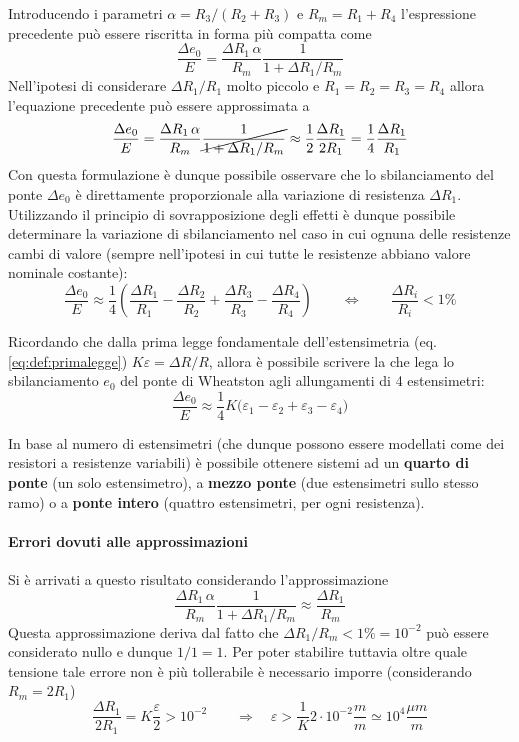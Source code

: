 		Introducendo i parametri $\alpha= R_3 / (R_2+R_3)$ e $R_m = R_1+R_4$ l'espressione precedente può essere riscritta in forma più compatta come
		\[ \frac{\Delta e_0}{E} = \frac{\Delta R_1 \, \alpha}{R_m} \frac{1}{1+\Delta R_1/R_m} \]
		Nell'ipotesi di considerare $\Delta R_1/R_1$ molto piccolo e $R_1=R_2=R_3=R_4$ allora l'equazione precedente può essere approssimata a
		\[ \frac{\Delta e_0}{E} = \frac{\Delta R_1 \, \alpha}{R_m} \cancel{\frac{1}{1+\Delta R_1/R_m}} \approx \frac 1 2 \frac{\Delta R_1}{2R_1} = \frac 1 4 \frac{\Delta R_1}{R_1} \]
		Con questa formulazione è dunque possibile osservare che lo sbilanciamento del ponte $\Delta e_0$ è direttamente proporzionale alla variazione di resistenza $\Delta R_1$. Utilizzando il principio di sovrapposizione degli effetti è dunque possibile determinare la variazione di sbilanciamento nel caso in cui ognuna delle resistenze cambi di valore (sempre nell'ipotesi in cui tutte le resistenze abbiano valore nominale costante):
		\[ \frac{\Delta e_0}{E} \approx \frac 1 4 \left( \frac{\Delta R_1}{R_1} - \frac{\Delta R_2}{R_2} +\frac{\Delta R_3}{R_3} - \frac{\Delta R_4}{R_4} \right) \qquad \Leftrightarrow \qquad \frac{\Delta R_i}{R_i} < 1\% \]
		
		\begin{concetto}
			Ricordando che dalla prima legge fondamentale dell'estensimetria (eq. \ref{eq:def:primalegge}) $K\varepsilon = \Delta R / R$, allora è possibile scrivere la  che lega lo sbilanciamento $e_0$ del ponte di Wheatston agli allungamenti di 4 estensimetri:
			\begin{equation}
				\frac{\Delta e_0}{E} \approx \frac 1 4 K \big( \varepsilon_1 - \varepsilon_2 + \varepsilon_3 - \varepsilon_4  \big)
			\end{equation}
		\end{concetto}
		
		In base al numero di estensimetri (che dunque possono essere modellati come dei resistori a resistenze variabili) è possibile ottenere sistemi ad un \textbf{quarto di ponte} (un solo estensimetro), a \textbf{mezzo ponte} (due estensimetri sullo stesso ramo) o a \textbf{ponte intero} (quattro estensimetri, per ogni resistenza).
		
		\paragraph{Errori dovuti alle approssimazioni} Si è arrivati a questo risultato considerando l'approssimazione
		\[\frac{\Delta R_1 \, \alpha}{R_m} \frac{1}{1+\Delta R_1/R_m} \approx \frac{\Delta R_1}{R_m} \]
		Questa approssimazione deriva dal fatto che $\Delta R_1/R_m < 1\% = 10^{-2}$ può essere considerato nullo e dunque $1/1=1$. Per poter stabilire tuttavia oltre quale tensione tale errore non è più tollerabile è necessario imporre (considerando $R_m = 2R_1$)
		\[ \frac{\Delta R_1}{2R_1} = K \frac\varepsilon 2 > 10^{-2} \qquad \Rightarrow \quad \varepsilon> \frac 1 K 2\cdot 10^{-2} \frac m m \simeq 10^4 \frac{\mu m}{m}  \]
		
